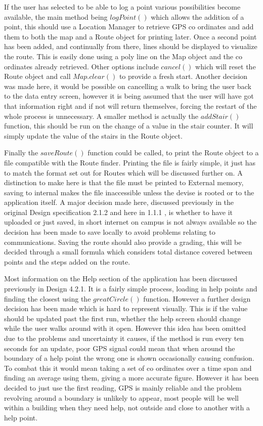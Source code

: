 If the user has selected to be able to log a point various possibilities become available, the main method being $logPoint()$ which allows the addition of a point, this should use a Location Manager to retrieve GPS co ordinates and add them to both the map and a Route object for printing later. Once a second point has been added, and continually from there, lines should be displayed to visualize the route. This is easily done using a poly line on the Map object and the co ordinates already retrieved. Other options include $cancel()$ which will reset the Route object and call $Map.clear()$ to provide a fresh start. Another decision was made here, it would be possible on cancelling a walk to bring the user back to the data entry screen, however it is being assumed that the user will have got that information right and if not will return themselves, forcing the restart of the whole process is unnecessary. A smaller method is actually the $addStair()$ function, this should be run on the change of a value in the stair counter. It will simply update the value of the stairs in the Route object. 

Finally the $saveRoute()$ function could be called, to print the Route object to a file compatible with the Route finder. Printing the file is fairly simple, it just has to match the format set out for Routes which will be discussed further on. A distinction to make here is that the file must be printed to External memory, saving to internal makes the file inaccessible unless the devise is rooted or to the application itself. A major decision made here, discussed previously in the original Design specification 2.1.2 and here in 1.1.1 , is whether to have it uploaded or just saved, in short internet on campus is not always available so the decision has been made to save locally to avoid problems relating to communications. Saving the route should also provide a grading, this will be decided through a small formula which considers total distance covered between points and the steps added on the route. 

Most information on the Help section of the application has been discussed previously in Design 4.2.1. It is a fairly simple process, loading in help points and finding the closest using the $greatCircle()$ function. However a further design decision has been made which is hard to represent visually. This is if the value should be updated past the first run, whether the help screen should change while the user walks around with it open. However this idea has been omitted due to the problems and uncertainty it causes, if the method is run every ten seconds for an update, poor GPS signal could mean that when around the boundary of a help point the wrong one is shown occasionally causing confusion. To combat this it would mean taking a set of co ordinates over a time span and finding an average using them, giving a more accurate figure. However it has been decided to just use the first reading, GPS is mainly reliable and the problem revolving around a boundary is unlikely to appear, most people will be well within a building when they need help, not outside and close to another with a help point. 

